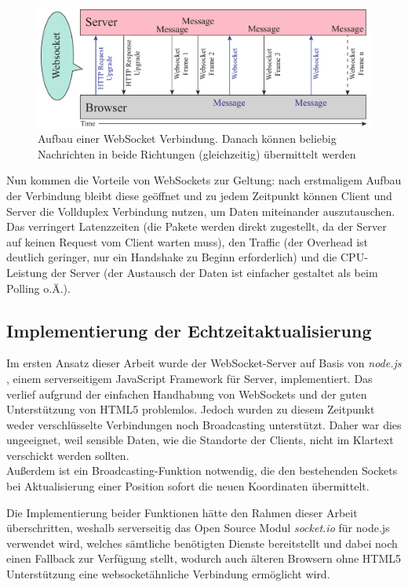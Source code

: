 \begin{figure}[!ht]
	\centering
	\includegraphics[width=15cm]{fig/websockets}
	\caption{Aufbau einer WebSocket Verbindung. Danach können beliebig Nachrichten in beide Richtungen (gleichzeitig) übermittelt werden}
\end{figure}

Nun kommen die Vorteile von WebSockets zur Geltung: nach erstmaligem Aufbau der Verbindung bleibt diese geöffnet und zu jedem Zeitpunkt können Client und Server die Vollduplex Verbindung nutzen, um Daten miteinander auszutauschen. Das verringert Latenzzeiten (die Pakete werden direkt zugestellt, da der Server auf keinen Request vom Client warten muss), den Traffic (der Overhead ist deutlich geringer, nur ein Handshake zu Beginn erforderlich) und die CPU-Leistung der Server (der Austausch der Daten ist einfacher gestaltet als beim Polling o.Ä.).

\subsection{Implementierung der Echtzeitaktualisierung}
Im ersten Ansatz dieser Arbeit wurde der WebSocket-Server auf Basis von \emph{node.js} \cite{node.js}, einem serverseitigem JavaScript Framework für Server, implementiert. Das verlief aufgrund der einfachen Handhabung von WebSockets und der guten Unterstützung von HTML5 problemlos. Jedoch wurden zu diesem Zeitpunkt weder verschlüsselte Verbindungen noch Broadcasting unterstützt. Daher war dies ungeeignet, weil sensible Daten, wie die Standorte der Clients, nicht im Klartext verschickt werden sollten.\\
Außerdem ist ein Broadcasting-Funktion notwendig, die den bestehenden Sockets bei Aktualisierung einer Position sofort die neuen Koordinaten übermittelt.\par

Die Implementierung beider Funktionen hätte den Rahmen dieser Arbeit überschritten, weshalb serverseitig das Open Source Modul \emph{socket.io} \cite{socket.io} für node.js verwendet wird, welches sämtliche benötigten Dienste bereitstellt und dabei noch einen Fallback zur Verfügung stellt, wodurch auch älteren Browsern ohne HTML5 Unterstützung eine websocketähnliche Verbindung ermöglicht wird.\par

